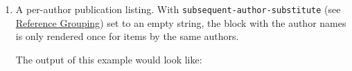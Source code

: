 \begin{enumerate}
\def\labelenumi{(\Alph{enumi})}
\setcounter{enumi}{1}
\item
  A per-author publication listing. With
  \texttt{subsequent-author-substitute} (see
  \protect\hyperlink{reference-grouping}{Reference Grouping}) set to an
  empty string, the block with the author names is only rendered once
  for items by the same authors.

\begin{Shaded}
\begin{Highlighting}[]
\NormalTok{\textless{}}\NormalTok{\textgreater{}}
\NormalTok{  \textless{}}\NormalTok{\textgreater{}}
\NormalTok{    \textless{}}\NormalTok{/\textgreater{}}
\NormalTok{    \textless{}}\NormalTok{/\textgreater{}}
\NormalTok{  \textless{}/}\NormalTok{\textgreater{}}
\NormalTok{  \textless{}}\NormalTok{\textgreater{}}
\NormalTok{    \textless{}}\NormalTok{\textgreater{}}
\NormalTok{      \textless{}}\NormalTok{/\textgreater{}}
\NormalTok{    \textless{}/}\NormalTok{\textgreater{}}
\NormalTok{    \textless{}}\NormalTok{\textgreater{}}
\NormalTok{      \textless{}}\NormalTok{\textgreater{}}
\NormalTok{        \textless{}}\NormalTok{ /\textgreater{}}
\NormalTok{      \textless{}/}\NormalTok{\textgreater{}}
\NormalTok{    \textless{}/}\NormalTok{\textgreater{}}
\NormalTok{    \textless{}}\NormalTok{\textgreater{}}
\NormalTok{      \textless{}}\NormalTok{/\textgreater{}}
\NormalTok{    \textless{}/}\NormalTok{\textgreater{}}
\NormalTok{  \textless{}/}\NormalTok{\textgreater{}}
\NormalTok{\textless{}/}\NormalTok{\textgreater{}}
\end{Highlighting}
\end{Shaded}

  The output of this example would look like:


\end{enumerate}

